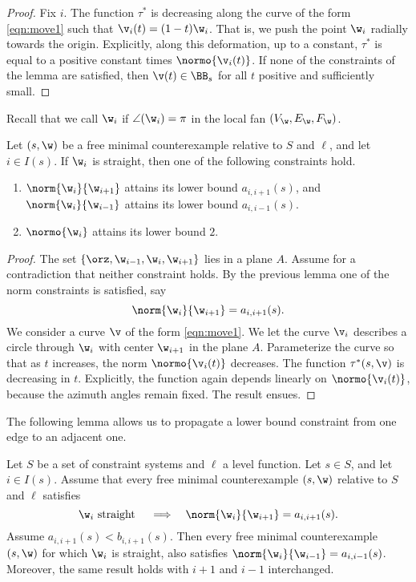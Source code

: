 \begin{proof} Fix $i$.  The function $\tau^*$ is decreasing along
the curve of the form \eqref{eqn:move1} such that
$\v_i(t)=(1-t) \w_i$.
That is, we push the point $\w_i$ radially towards the origin.
Explicitly, along this deformation, up to a constant, $\tau^*$ is equal
to a positive constant times $\normo{\v_i(t)}$.
If none of the constraints of the lemma are satisfied, then
$\v(t)\in \BB_s$ for all $t$ positive and sufficiently
small.
\end{proof}

Recall that we call $\w_i$ 
if $\angle(\w_i)=\pi$ in the local fan $(V_\w,E_\w,F_\w)$.

\begin{lemma} 
  Let $(s,\w)$ be a free minimal counterexample relative to $S$ and
  $\ell$,  and let $i\in I(s)$.  If $\w_i$ is straight, then one of the
  following constraints hold.
\begin{enumerate}
\item $\norm{\w_i}{\w_{i+1}}$ attains its lower bound $a_{i,i+1}(s)$, and
 $\norm{\w_i}{\w_{i-1}}$ attains its lower bound $a_{i,i-1}(s)$.
\item $\normo{\w_i}$ attains its lower bound $2$.
\end{enumerate}
\end{lemma}

\begin{proof}  The set $\{\orz,\w_{i-1},\w_i,\w_{i+1}\}$ lies in a plane $A$.
Assume for a contradiction that neither constraint holds.  By the previous
lemma one of the norm constraints is satisfied, say
\[
\norm{\w_i}{\w_{i+1}}=a_{i,i+1}(s).
\]
We consider a  curve $\v$ of the form \eqref{eqn:move1}.
We let the curve $\v_i$ describes a circle through
 $\w_i$ with center $\w_{i+1}$ in the plane $A$.  Parameterize the curve
so that as $t$ increases, the norm $\normo{\v_i(t)}$ decreases.
The function $\tau^*(s,\v)$ is decreasing in $t$.  Explicitly, the
function again depends linearly on $\normo{\v_i(t)}$, because
the azimuth angles remain fixed.  The result ensues.
\end{proof}

The following lemma allows us to propagate a lower bound constraint
from one edge to an adjacent one.

\begin{lemma} 
  Let $S$ be a set of constraint systems and $\ell$ a level
  function. Let $s\in S$, and let $i\in I(s)$.  Assume that every
  free minimal counterexample $(s,\w)$ relative to $S$ and $\ell$
  satisfies
\[
\w_i \text{ straight } \quad
\Longrightarrow\quad \norm{\w_i}{\w_{i+1}}=a_{i,i+1}(s).
\]
Assume $a_{i,i+1}(s)<b_{i,i+1}(s)$.
Then every free minimal counterexample $(s,\w)$
for which $\w_i$ is straight, also satisfies $\norm{\w_i}{\w_{i-1}}=a_{i,i-1}(s)$.
Moreover, the same result holds with $i+1$ and $i-1$ interchanged.
\end{lemma}

